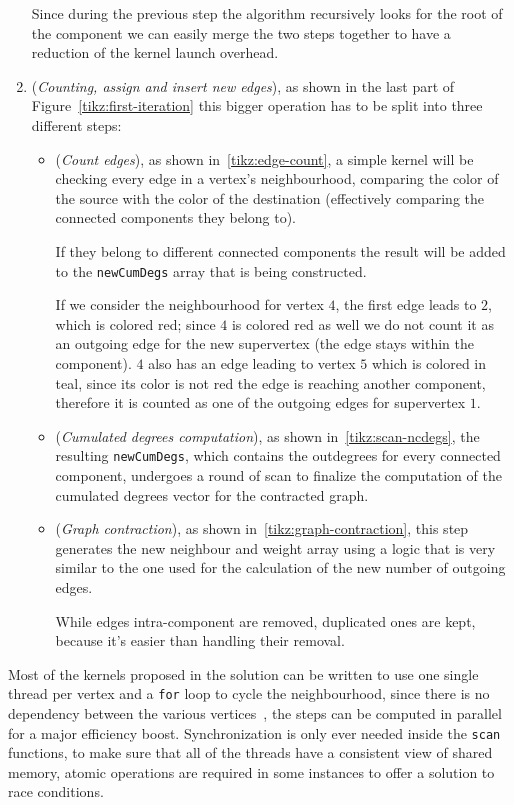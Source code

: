 \documentclass[a4paper,10pt]{article}
\begin{document}
\begin{enumerate}
	Since during the previous step the algorithm recursively looks for the root of the
	component we can easily merge the two steps together to have a reduction of the
	kernel launch overhead.
	\item\label{item:graph-contraction} (\textit{Counting, assign and insert new edges}), as shown in the last part of Figure~\ref{tikz:first-iteration} this bigger operation has to be split into three different steps:
	\begin{itemize}
		\item\label{item:count-edges} (\textit{Count edges}), as shown in~\ref{tikz:edge-count}, a simple kernel will be checking every edge in a vertex's neighbourhood, comparing the color of the source with the color of the destination (effectively comparing the connected components they belong to).

		If they belong to different connected components the result will be added to the \texttt{newCumDegs} array that is being constructed.

		If we consider the neighbourhood for vertex $4$, the first edge leads to
		$2$, which is colored red; since $4$ is colored red as well we do not count
		it as an outgoing edge for the new supervertex (the edge stays within the
		component). $4$ also has an edge leading to vertex $5$ which is colored in
		teal, since its color is not red the edge is reaching another component,
		therefore it is counted as one of the outgoing edges for supervertex $1$.
		\item\label{item:scan-ncd} (\textit{Cumulated degrees computation}), as shown in~\ref{tikz:scan-ncdegs}, the resulting \texttt{newCumDegs}, which contains the outdegrees for every connected component, undergoes a round of scan to finalize the computation of the cumulated degrees vector for the contracted graph.
		\item\label{item:graph-regen} (\textit{Graph contraction}), as shown in~\ref{tikz:graph-contraction}, this step generates the new neighbour and weight array using a logic that is very similar to the one used for the calculation of the new number of outgoing edges.

		While edges intra-component are removed, duplicated ones are kept, because it's easier than handling their removal.
	\end{itemize}
\end{enumerate}
Most of the kernels proposed in the solution can be written to use one single thread per vertex and a \texttt{for} loop to cycle the neighbourhood, since there is no dependency between the various vertices~\cite{generic-he-boruvka}, the steps can be computed in parallel for a major efficiency boost. Synchronization is only ever needed inside the \texttt{scan} functions, to make sure that all of the threads have a consistent view of shared memory, atomic operations are required in some instances to offer a solution to race conditions.
\end{document}
